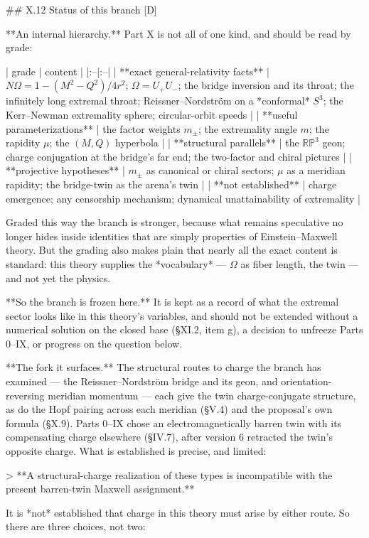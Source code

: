 ## X.12 Status of this branch [D]

**An internal hierarchy.** Part X is not all of one kind, and should be read by grade:

| grade | content |
|:--|:--|
| **exact general-relativity facts** | $N\Omega = 1-(M^2-Q^2)/4r^2$; $\Omega = U_+U_-$; the bridge inversion and its throat; the infinitely long extremal throat; Reissner–Nordström on a *conformal* $S^3$; the Kerr–Newman extremality sphere; circular-orbit speeds |
| **useful parameterizations** | the factor weights $m_\pm$; the extremality angle $m$; the rapidity $\mu$; the $(M,Q)$ hyperbola |
| **structural parallels** | the $\mathbb{RP}^3$ geon; charge conjugation at the bridge's far end; the two-factor and chiral pictures |
| **projective hypotheses** | $m_\pm$ as canonical or chiral sectors; $\mu$ as a meridian rapidity; the bridge-twin as the arena's twin |
| **not established** | charge emergence; any censorship mechanism; dynamical unattainability of extremality |

Graded this way the branch is stronger, because what remains speculative no longer hides inside identities that are simply properties of Einstein–Maxwell theory. But the grading also makes plain that nearly all the exact content is standard: this theory supplies the *vocabulary* — $\Omega$ as fiber length, the twin — and not yet the physics.

**So the branch is frozen here.** It is kept as a record of what the extremal sector looks like in this theory's variables, and should not be extended without a numerical solution on the closed base (§XI.2, item g), a decision to unfreeze Parts 0–IX, or progress on the question below.

**The fork it surfaces.** The structural routes to charge the branch has examined — the Reissner–Nordström bridge and its geon, and orientation-reversing meridian momentum — each give the twin charge-conjugate structure, as do the Hopf pairing across each meridian (§V.4) and the proposal's own formula (§X.9). Parts 0–IX chose an electromagnetically barren twin with its compensating charge elsewhere (§IV.7), after version 6 retracted the twin's opposite charge. What is established is precise, and limited:

> **A structural-charge realization of these types is incompatible with the present barren-twin Maxwell assignment.**

It is *not* established that charge in this theory must arise by either route. So there are three choices, not two:

